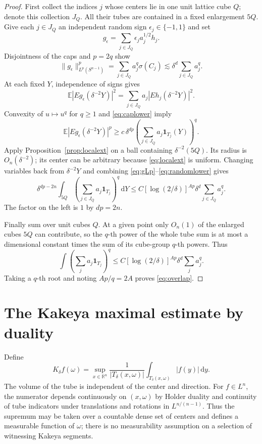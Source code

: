 \documentclass[11pt,a4paper]{article}
\numberwithin{equation}{section}
\theoremstyle{definition}
\theoremstyle{remark}
\newcommand{\R}{\mathbb R}
\newcommand{\dd}{\,\mathrm d}
\newcommand{\one}{\mathbf 1}
\newcommand{\Sph}{S^{n-1}}
\begin{document}
\begin{proof}
First collect the indices $j$ whose centers lie in one unit lattice
cube $Q$; denote this collection $J_Q$. All their tubes are contained
in a fixed enlargement $5Q$. Give each $j\in J_Q$ an independent
random sign $\epsilon_j\in\{-1,1\}$ and set
\[
 g_\epsilon=\sum_{j\in J_Q}\epsilon_j a_j^{1/2}h_j.
\]
Disjointness of the caps and $p=2q$ show
\begin{equation}\label{eq:gLp}
 \|g_\epsilon\|_{L^p(\Sph)}^p
   =\sum_{j\in J_Q}a_j^q\sigma(C_j)
   \lesssim\delta^d\sum_{j\in J_Q}a_j^q.
\end{equation}
At each fixed $Y$, independence of signs gives
\[
 \mathbb E|Eg_\epsilon(\delta^{-2}Y)|^2
       =\sum_{j\in J_Q}a_j|Eh_j(\delta^{-2}Y)|^2.
\]
Convexity of $u\mapsto u^q$ for $q\ge1$ and
\eqref{eq:caplower} imply
\begin{equation}\label{eq:randomlower}
 \mathbb E|Eg_\epsilon(\delta^{-2}Y)|^p
 \ge c\,\delta^{dp}\left(\sum_{j\in J_Q}
                         a_j\one_{T_j}(Y)\right)^q.
\end{equation}
Apply Proposition~\ref{prop:localext} on a ball containing
$\delta^{-2}(5Q)$. Its radius is $O_n(\delta^{-2})$;
its center can be arbitrary because \eqref{eq:localext} is uniform.
Changing variables back from $\delta^{-2}Y$ and combining
\eqref{eq:gLp}--\eqref{eq:randomlower} gives
\begin{equation}\label{eq:localtubes}
 \delta^{dp-2n}\int_{5Q}
       \left(\sum_{j\in J_Q}a_j\one_{T_j}\right)^q\dd Y
 \le C[\log(2/\delta)]^{Ap}\delta^d\sum_{j\in J_Q}a_j^q.
\end{equation}
The factor on the left is $1$ by $dp=2n$.

Finally sum over unit cubes $Q$. At a given point only $O_n(1)$ of
the enlarged cubes $5Q$ can contribute, so the $q$-th power of the
whole tube sum is at most a dimensional constant times the sum of
its cube-group $q$-th powers. Thus
\[
 \int\left(\sum_j a_j\one_{T_j}\right)^q
  \le C[\log(2/\delta)]^{Ap}\delta^d\sum_j a_j^q.
\]
Taking a $q$-th root and noting $Ap/q=2A$ proves
\eqref{eq:overlap}.
\end{proof}

\section{The Kakeya maximal estimate by duality}
\label{sec:maximal}
Define
\begin{equation}\label{eq:maximal}
 K_\delta f(\omega)=\sup_{x\in\R^n}
       \frac1{|T_\delta(x,\omega)|}
                  \int_{T_\delta(x,\omega)}|f(y)|\dd y.
\end{equation}
The volume of the tube is independent of the center and direction.
For $f\in L^n$, the numerator depends continuously on $(x,\omega)$
by Holder duality and continuity of tube indicators under translations
and rotations in $L^{n/(n-1)}$. Thus the supremum may be taken over a
countable dense set of centers and defines a measurable function of
$\omega$; there is no measurability assumption on a selection of
witnessing Kakeya segments.
\end{document}
